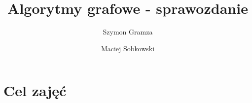 \documentclass[a4paper,12pt]{article}
\begin{document}
\author{Szymon Gramza\and Maciej Sobkowski}
\title{Algorytmy grafowe - sprawozdanie}
\maketitle

\section{Cel zajęć}
\end{document}

